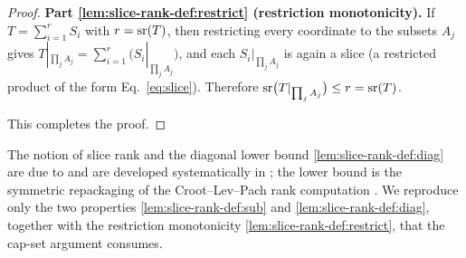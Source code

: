 \begin{proof}
\smallskip\noindent
\textbf{Part \ref{lem:slice-rank-def:restrict} (restriction monotonicity).}
If $T=\sum_{i=1}^{r}S_i$ with $r=\operatorname{sr}(T)$, then restricting every coordinate to the
subsets $A_j$ gives $T|_{\prod_j A_j}=\sum_{i=1}^{r}\big(S_i|_{\prod_j A_j}\big)$,
and each $S_i|_{\prod_j A_j}$ is again a slice (a restricted product of the form
Eq.~\eqref{eq:slice}). Therefore $\operatorname{sr}\!\big(T|_{\prod_j A_j}\big)\le r=\operatorname{sr}(T)$.

This completes the proof.
\end{proof}

\begin{remark}[Provenance]\label{rem:slice-prov}
The notion of slice rank and the diagonal lower bound \ref{lem:slice-rank-def:diag}
are due to \cite{tao2016slicerank} and are developed systematically in
\cite{bccgnsu2017}; the lower bound is the symmetric repackaging of the
Croot–Lev–Pach rank computation \cite{crootlevpach2017}. We reproduce only the two
properties \ref{lem:slice-rank-def:sub} and \ref{lem:slice-rank-def:diag}, together
with the restriction monotonicity \ref{lem:slice-rank-def:restrict}, that the cap-set
argument consumes.
\end{remark}
